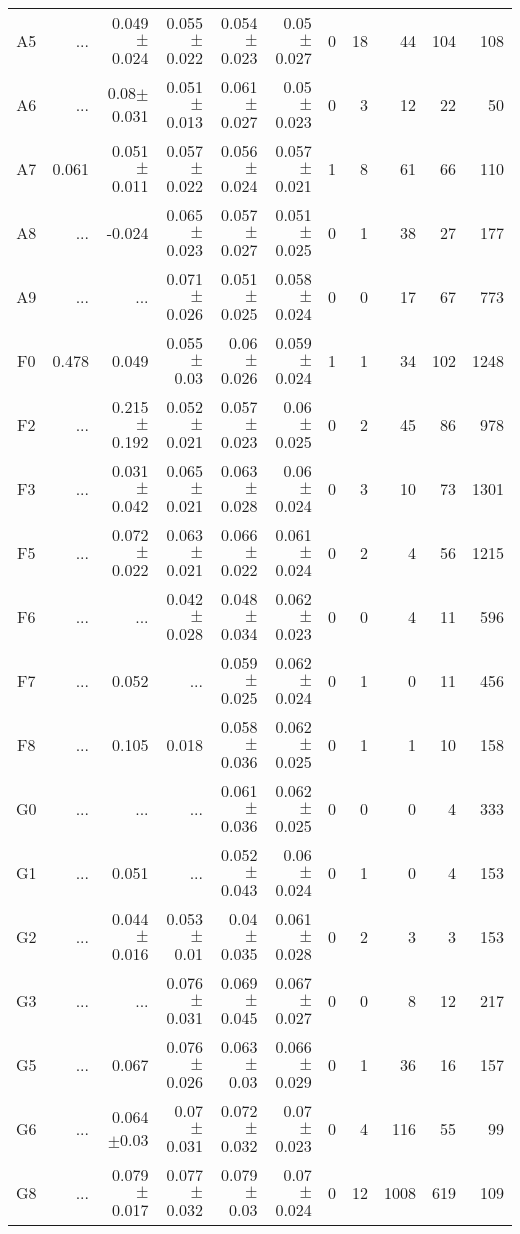 \begin{table}[t]
\begin{center}
\begin{tabular}{c|rrrrr|rrrrr}
A5	&	 ...	&	0.049$\pm$0.024	&	0.055$\pm$0.022	&	0.054$\pm$0.023	&	0.05$\pm$0.027	&	0	&	18	&	44	&	104	&	108	\\
A6	&	 ...	&	0.08$\pm$0.031	&	0.051$\pm$0.013	&	0.061$\pm$0.027	&	0.05$\pm$0.023	&	0	&	3	&	12	&	22	&	50	\\
A7	&	0.061	&	0.051$\pm$0.011	&	0.057$\pm$0.022	&	0.056$\pm$0.024	&	0.057$\pm$0.021	&	1	&	8	&	61	&	66	&	110	\\
A8	&	 ...	&	-0.024	&	0.065$\pm$0.023	&	0.057$\pm$0.027	&	0.051$\pm$0.025	&	0	&	1	&	38	&	27	&	177	\\
A9	&	 ...	&	 ...	&	0.071$\pm$0.026	&	0.051$\pm$0.025	&	0.058$\pm$0.024	&	0	&	0	&	17	&	67	&	773	\\
F0	&	0.478	&	0.049	&	0.055$\pm$0.03	&	0.06$\pm$0.026	&	0.059$\pm$0.024	&	1	&	1	&	34	&	102	&	1248	\\
F2	&	 ...	&	0.215$\pm$0.192	&	0.052$\pm$0.021	&	0.057$\pm$0.023	&	0.06$\pm$0.025	&	0	&	2	&	45	&	86	&	978	\\
F3	&	 ...	&	0.031$\pm$0.042	&	0.065$\pm$0.021	&	0.063$\pm$0.028	&	0.06$\pm$0.024	&	0	&	3	&	10	&	73	&	1301	\\
F5	&	 ...	&	0.072$\pm$0.022	&	0.063$\pm$0.021	&	0.066$\pm$0.022	&	0.061$\pm$0.024	&	0	&	2	&	4	&	56	&	1215	\\
F6	&	 ...	&	 ...	&	0.042$\pm$0.028	&	0.048$\pm$0.034	&	0.062$\pm$0.023	&	0	&	0	&	4	&	11	&	596	\\
F7	&	 ...	&	0.052	&	 ...	&	0.059$\pm$0.025	&	0.062$\pm$0.024	&	0	&	1	&	0	&	11	&	456	\\
F8	&	 ...	&	0.105	&	0.018	&	0.058$\pm$0.036	&	0.062$\pm$0.025	&	0	&	1	&	1	&	10	&	158	\\
G0	&	 ...	&	 ...	&	 ...	&	0.061$\pm$0.036	&	0.062$\pm$0.025	&	0	&	0	&	0	&	4	&	333	\\
G1	&	 ...	&	0.051	&	 ...	&	0.052$\pm$0.043	&	0.06$\pm$0.024	&	0	&	1	&	0	&	4	&	153	\\
G2	&	 ...	&	0.044$\pm$0.016	&	0.053$\pm$0.01	&	0.04$\pm$0.035	&	0.061$\pm$0.028	&	0	&	2	&	3	&	3	&	153	\\
G3	&	 ...	&	 ...	&	0.076$\pm$0.031	&	0.069$\pm$0.045	&	0.067$\pm$0.027	&	0	&	0	&	8	&	12	&	217	\\
G5	&	 ...	&	0.067	&	0.076$\pm$0.026	&	0.063$\pm$0.03	&	0.066$\pm$0.029	&	0	&	1	&	36	&	16	&	157	\\
G6	&	 ...	&	0.064$\pm$0.03	&	0.07$\pm$0.031	&	0.072$\pm$0.032	&	0.07$\pm$0.023	&	0	&	4	&	116	&	55	&	99	\\
G8	&	 ...	&	0.079$\pm$0.017	&	0.077$\pm$0.032	&	0.079$\pm$0.03	&	0.07$\pm$0.024	&	0	&	12	&	1008	&	619	&	109	\\

\end{tabular}
\end{center}
\end{table}
